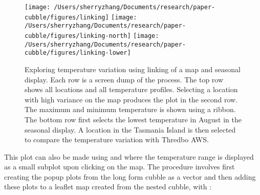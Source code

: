 \documentclass{article}
\newenvironment{Shaded}{\begin{snugshade}}{\end{snugshade}}
\newcommand{\AttributeTok}[1]{\textcolor[rgb]{0.77,0.63,0.00}{#1}}
\newcommand{\CommentTok}[1]{\textcolor[rgb]{0.56,0.35,0.01}{\textit{#1}}}
\newcommand{\ControlFlowTok}[1]{\textcolor[rgb]{0.13,0.29,0.53}{\textbf{#1}}}
\newcommand{\DecValTok}[1]{\textcolor[rgb]{0.00,0.00,0.81}{#1}}
\newcommand{\FunctionTok}[1]{\textcolor[rgb]{0.00,0.00,0.00}{#1}}
\newcommand{\NormalTok}[1]{#1}
\newcommand{\OtherTok}[1]{\textcolor[rgb]{0.56,0.35,0.01}{#1}}
\newcommand{\SpecialCharTok}[1]{\textcolor[rgb]{0.00,0.00,0.00}{#1}}
\newcommand{\StringTok}[1]{\textcolor[rgb]{0.31,0.60,0.02}{#1}}
\begin{document}
\begin{figure}
\texttt{[image: /Users/sherryzhang/Documents/research/paper-cubble/figures/linking]} \texttt{[image: /Users/sherryzhang/Documents/research/paper-cubble/figures/linking-north]} \texttt{[image: /Users/sherryzhang/Documents/research/paper-cubble/figures/linking-lower]} \caption{Exploring temperature variation using linking of a map and seasonal display. Each row is a screen dump of the process. The top row shows all locations and all temperature profiles. Selecting a location with high variance on the map produces the plot in the second row. The maximum and minimum temperature is shown using a ribbon. The bottom row first selects the lowest temperature in August in the seasonal display. A location in the Tasmania Island is then selected to compare the temperature variation with Thredbo AWS.}\label{fig:interactive-linking}
\end{figure}

This plot can also be made using  and  where the temperature range is displayed as a small subplot upon clicking on the map. The procedure involves first creating the popup plots from the long form cubble as a vector and then adding these plots to a leaflet map created from the nested cubble, with :

\begin{Shaded}
\end{Shaded}
\end{document}
